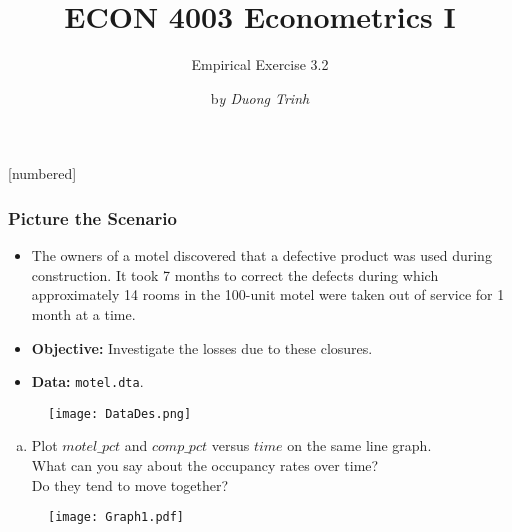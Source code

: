 \documentclass[11pt, xcolor=x11names,compress]{beamer}
\title [ECON 4003: Empirical Exercise 3.2]{ECON 4003 Econometrics I}
\author[]{Empirical Exercise 3.2}
\date{b\textit{y Duong Trinh}}
\begin{document}
[numbered]
{
\frame{\titlepage}}


\begin{frame}[fragile,t]
\linespread{1.3}
\frametitle{Picture the Scenario}
\begin{itemize}
    \item The owners of a motel discovered that a defective product was used during construction. It took 7 months to correct the defects during which approximately 14 rooms in the 100-unit motel were taken out of service for 1 month at a time.
    \item \textbf{Objective:} Investigate the losses due to these closures.
    \item \textbf{Data:}  \texttt{motel.dta}.
\end{itemize}
\end{frame}

\begin{frame}[fragile,t]
\begin{figure}[h]
    \centering
    \texttt{[image: DataDes.png]}
    \caption{}
    \label{fig:my_label}
\end{figure}
\end{frame}

\begin{frame}[fragile,t]
\begin{enumerate}[(a)]
    \item Plot $motel\_pct$ and $comp\_pct$ versus $time$ on the same line graph.\\
    What can you say about the occupancy rates over time?\\ 
    Do they tend to move together? 
\vspace{4mm}
\end{enumerate}
\pause
\begin{figure}[h]
    \centering
    \texttt{[image: Graph1.pdf]}
    \caption{}
    \label{fig:my_label}
\end{figure}
\end{frame}
\end{document}

